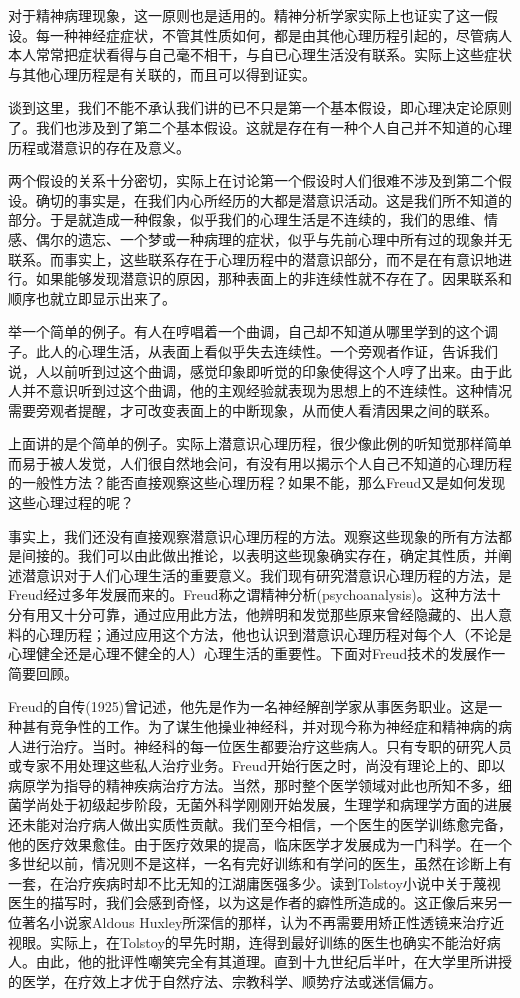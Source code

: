 \documentclass[UTF8,10pt,a4paper,openany]{book}
\begin{document}
对于精神病理现象，这一原则也是适用的。精神分析学家实际上也证实了这一假设。每一种神经症症状，不管其性质如何，都是由其他心理历程引起的，尽管病人本人常常把症状看得与自己毫不相干，与自已心理生活没有联系。实际上这些症状与其他心理历程是有关联的，而且可以得到证实。

谈到这里，我们不能不承认我们讲的已不只是第一个基本假设，即心理决定论原则了。我们也涉及到了第二个基本假设。这就是存在有一种个人自己并不知道的心理历程或潜意识的存在及意义。

两个假设的关系十分密切，实际上在讨论第一个假设时人们很难不涉及到第二个假设。确切的事实是，在我们内心所经历的大都是潜意识活动。这是我们所不知道的部分。于是就造成一种假象，似乎我们的心理生活是不连续的，我们的思维、情感、偶尔的遗忘、一个梦或一种病理的症状，似乎与先前心理中所有过的现象并无联系。而事实上，这些联系存在于心理历程中的潜意识部分，而不是在有意识地进行。如果能够发现潜意识的原因，那种表面上的非连续性就不存在了。因果联系和顺序也就立即显示出来了。

举一个简单的例子。有人在哼唱着一个曲调，自己却不知道从哪里学到的这个调子。此人的心理生活，从表面上看似乎失去连续性。一个旁观者作证，告诉我们说，人以前听到过这个曲调，感觉印象即听觉的印象使得这个人哼了出来。由于此人并不意识听到过这个曲调，他的主观经验就表现为思想上的不连续性。这种情况需要旁观者提醒，才可改变表面上的中断现象，从而使人看清因果之间的联系。

上面讲的是个简单的例子。实际上潜意识心理历程，很少像此例的听知觉那样简单而易于被人发觉，人们很自然地会问，有没有用以揭示个人自己不知道的心理历程的一般性方法？能否直接观察这些心理历程？如果不能，那么Freud又是如何发现这些心理过程的呢？

事实上，我们还没有直接观察潜意识心理历程的方法。观察这些现象的所有方法都是间接的。我们可以由此做出推论，以表明这些现象确实存在，确定其性质，并阐述潜意识对于人们心理生活的重要意义。我们现有研究潜意识心理历程的方法，是Freud经过多年发展而来的。Freud称之谓精神分析(psychoanalysis)。这种方法十分有用又十分可靠，通过应用此方法，他辨明和发觉那些原来曾经隐藏的、出人意料的心理历程；通过应用这个方法，他也认识到潜意识心理历程对每个人（不论是心理健全还是心理不健全的人）心理生活的重要性。下面对Freud技术的发展作一简要回顾。

Freud的自传(1925)曾记述，他先是作为一名神经解剖学家从事医务职业。这是一种甚有竞争性的工作。为了谋生他操业神经科，并对现今称为神经症和精神病的病人进行治疗。当时。神经科的每一位医生都要治疗这些病人。只有专职的研究人员或专家不用处理这些私人治疗业务。Freud开始行医之时，尚没有理论上的、即以病原学为指导的精神疾病治疗方法。当然，那时整个医学领域对此也所知不多，细菌学尚处于初级起步阶段，无菌外科学刚刚开始发展，生理学和病理学方面的进展还未能对治疗病人做出实质性贡献。我们至今相信，一个医生的医学训练愈完备，他的医疗效果愈佳。由于医疗效果的提高，临床医学才发展成为一门科学。在一个多世纪以前，情况则不是这样，一名有完好训练和有学问的医生，虽然在诊断上有一套，在治疗疾病时却不比无知的江湖庸医强多少。读到Tolstoy小说中关于蔑视医生的描写时，我们会感到奇怪，以为这是作者的癖性所造成的。这正像后来另一位著名小说家Aldous Huxley所深信的那样，认为不再需要用矫正性透镜来治疗近视眼。实际上，在Tolstoy的早先时期，连得到最好训练的医生也确实不能治好病人。由此，他的批评性嘲笑完全有其道理。直到十九世纪后半叶，在大学里所讲授的医学，在疗效上才优于自然疗法、宗教科学、顺势疗法或迷信偏方。
\end{document}
